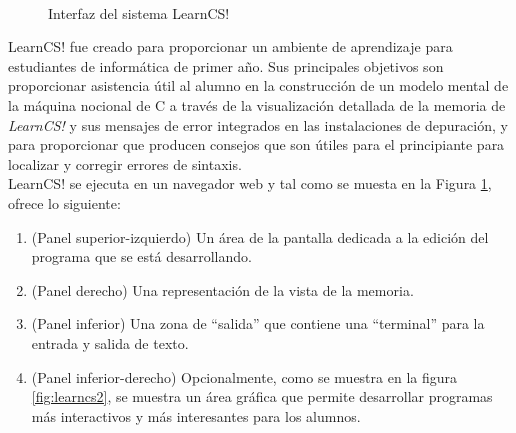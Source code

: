 \begin{figure}[!h]
  \centering
  \\
  \caption[LearnCS]{Interfaz del sistema LearnCS! \protect\cite{lipman_learncs_2014}}
  \label{fig:learncs}
\end{figure}

LearnCS! fue creado para proporcionar un ambiente de aprendizaje para estudiantes de informática de primer año. Sus principales objetivos son proporcionar asistencia útil al alumno en la construcción de un modelo mental de la máquina nocional de C a través de la visualización detallada de la memoria de \emph{LearnCS!} y sus mensajes de error integrados en las instalaciones de depuración, y para proporcionar que producen consejos que son útiles para el principiante para localizar y corregir errores de sintaxis\cite{lipman_learncs_2014}.\\

LearnCS! se ejecuta en un navegador web y tal como se muesta en la Figura \ref{fig:learncs}, ofrece lo siguiente:

\begin{enumerate}
  \item (Panel superior-izquierdo) Un área de la pantalla dedicada a la edición del programa que se está desarrollando.
  \item (Panel derecho) Una representación de la vista de la memoria.
  \item (Panel inferior) Una zona de ``salida'' que contiene una ``terminal'' para la entrada y salida de texto.
  \item (Panel inferior-derecho) Opcionalmente, como se muestra en la figura \ref{fig:learncs2}, se muestra un área gráfica que permite desarrollar programas más interactivos y más interesantes para los alumnos.
\end{enumerate}

